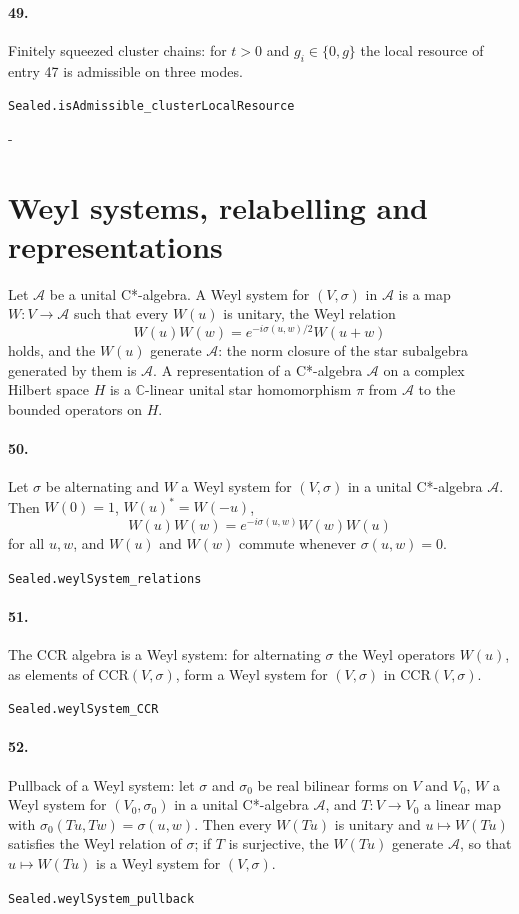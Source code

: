 \documentclass[11pt]{article}
\makeatletter
\newcommand{\keepspace}[1]{\par\penalty-100\begingroup\setlength{\dimen@}{#1}\dimen@ii\pagegoal\advance\dimen@ii-\pagetotal\ifdim\dimen@>\dimen@ii\ifdim\dimen@ii>\z@\vfil\fi\break\fi\endgroup}
\makeatother
\begin{document}
\paragraph{49.} Finitely squeezed cluster chains: for $t > 0$ and $g_i \in \{0, g\}$ the local resource of entry 47 is admissible on three modes.\par{\footnotesize\texttt{Sealed.isAdmissible\_clusterLocalResource}}

\keepspace{14\baselineskip}\section*{Weyl systems, relabelling and representations}
Let $\mathcal A$ be a unital C*-algebra. A Weyl system for $(V, \sigma)$ in $\mathcal A$ is a map $W : V \to \mathcal A$ such that every $W(u)$ is unitary, the Weyl relation \[W(u) W(w) = e^{-i\sigma(u, w)/2} W(u + w)\] holds, and the $W(u)$ generate $\mathcal A$: the norm closure of the star subalgebra generated by them is $\mathcal A$. A representation of a C*-algebra $\mathcal A$ on a complex Hilbert space $H$ is a $\mathbb C$-linear unital star homomorphism $\pi$ from $\mathcal A$ to the bounded operators on $H$.

\paragraph{50.} Let $\sigma$ be alternating and $W$ a Weyl system for $(V, \sigma)$ in a unital C*-algebra $\mathcal A$. Then $W(0) = 1$, $W(u)^* = W(-u)$, \[W(u) W(w) = e^{-i\sigma(u, w)} W(w) W(u)\] for all $u, w$, and $W(u)$ and $W(w)$ commute whenever $\sigma(u, w) = 0$.\par{\footnotesize\texttt{Sealed.weylSystem\_relations}}

\paragraph{51.} The CCR algebra is a Weyl system: for alternating $\sigma$ the Weyl operators $W(u)$, as elements of $\mathrm{CCR}(V, \sigma)$, form a Weyl system for $(V, \sigma)$ in $\mathrm{CCR}(V, \sigma)$.\par{\footnotesize\texttt{Sealed.weylSystem\_CCR}}

\paragraph{52.} Pullback of a Weyl system: let $\sigma$ and $\sigma_0$ be real bilinear forms on $V$ and $V_0$, $W$ a Weyl system for $(V_0, \sigma_0)$ in a unital C*-algebra $\mathcal A$, and $T : V \to V_0$ a linear map with $\sigma_0(Tu, Tw) = \sigma(u, w)$. Then every $W(Tu)$ is unitary and $u \mapsto W(Tu)$ satisfies the Weyl relation of $\sigma$; if $T$ is surjective, the $W(Tu)$ generate $\mathcal A$, so that $u \mapsto W(Tu)$ is a Weyl system for $(V, \sigma)$.\par{\footnotesize\texttt{Sealed.weylSystem\_pullback}}
\end{document}
